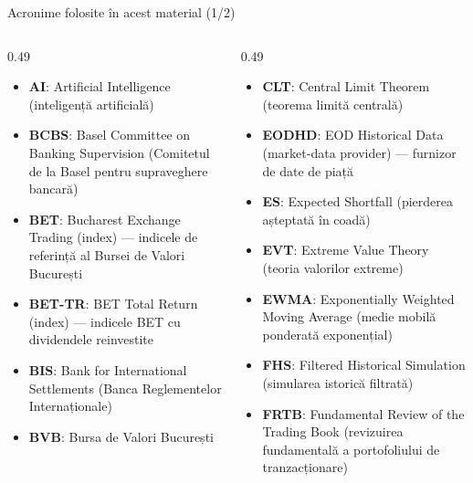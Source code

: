 {
\begin{frame}[noframenumbering]
    \titlepage
\end{frame}
}
\begin{frame}{Acronime folosite în acest material (1/2)}
\begin{columns}[T]
\begin{column}{0.49\textwidth}
\begin{itemize}\setlength{\itemsep}{0pt}
    \item \textbf{AI}: Artificial Intelligence (inteligență artificială)
    \item \textbf{BCBS}: Basel Committee on Banking Supervision (Comitetul de la Basel pentru supraveghere bancară)
    \item \textbf{BET}: Bucharest Exchange Trading (index) — indicele de referință al Bursei de Valori București
    \item \textbf{BET-TR}: BET Total Return (index) — indicele BET cu dividendele reinvestite
    \item \textbf{BIS}: Bank for International Settlements (Banca Reglementelor Internaționale)
    \item \textbf{BVB}: Bursa de Valori București
\end{itemize}
\end{column}
\begin{column}{0.49\textwidth}
\begin{itemize}\setlength{\itemsep}{0pt}
    \item \textbf{CLT}: Central Limit Theorem (teorema limită centrală)
    \item \textbf{EODHD}: EOD Historical Data (market-data provider) — furnizor de date de piață
    \item \textbf{ES}: Expected Shortfall (pierderea așteptată în coadă)
    \item \textbf{EVT}: Extreme Value Theory (teoria valorilor extreme)
    \item \textbf{EWMA}: Exponentially Weighted Moving Average (medie mobilă ponderată exponențial)
    \item \textbf{FHS}: Filtered Historical Simulation (simularea istorică filtrată)
    \item \textbf{FRTB}: Fundamental Review of the Trading Book (revizuirea fundamentală a portofoliului de tranzacționare)
\end{itemize}
\end{column}
\end{columns}
\end{frame}
